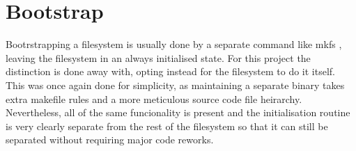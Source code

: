     \section{Bootstrap}

        Bootrstrapping a filesystem is usually done by a separate command like
        mkfs \cite{man_mkfs}, leaving the filesystem in an always initialised
        state. For this project the distinction is done away with, opting
        instead for the filesystem to do it itself. This was once again done
        for simplicity, as maintaining a separate binary takes extra makefile
        rules and a more meticulous source code file heirarchy. Nevertheless,
        all of the same funcionality is present and the initialisation routine
        is very clearly separate from the rest of the filesystem so that it can
        still be separated without requiring major code reworks.



